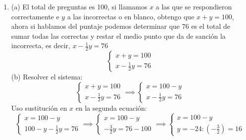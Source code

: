 \documentclass[a4paper]{article}
\begin{document}
\begin{enumerate}
\begin{itemize}
        \end{itemize}
        \item (a) El total de preguntas es 100, si llamamos $x$ a las que se respondieron correctamente e $y$ a las incorrectas o en blanco, obtengo que $x+y=100$, ahora si hablamos del puntaje podemos determinar que $76$ es el total de sumar todas las correctas y restar el medio punto que da de sanción la incorrecta, es decir, $x-\frac{1}{2}y=76$
        \begin{equation*}
            \left\{
            \begin{array}{l}
                x+y=100\\
                x-\frac{1}{2}y=76
            \end{array}
            \right.
        \end{equation*}
        (b) Resolver el sistema:
        \begin{equation*}
            \left\{
            \begin{array}{l}
                x+y=100\\
                x-\frac{1}{2}y=76
            \end{array}
            \right.
            \implies
            \left\{
            \begin{array}{l}
                x=100-y\\
                x-\frac{1}{2}y=76
            \end{array}
            \right.
        \end{equation*}
        Uso sustitución en $x$ en la segunda ecuación:
        \begin{equation*}
            \left\{
            \begin{array}{l}
                x=100-y\\
                100-y-\frac{1}{2}y=76
            \end{array}
            \right.
            \implies
            \left\{
            \begin{array}{l}
                x=100-y\\
                -\frac{3}{2}y=76-100
            \end{array}
            \right.
            \implies\left\{
            \begin{array}{l}
                x=100-y\\
                y=-24 : \left(-\frac{3}{2}\right)=16
            \end{array}
            \right.
        \end{equation*}

\end{enumerate}
\end{document}
